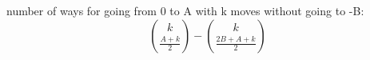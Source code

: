 number of ways for going from 0 to A with k moves without going to -B:
$$ \binom{k}{\frac{A+k}{2}} - \binom{k}{\frac{2B+A+k}{2}} $$
\hline

